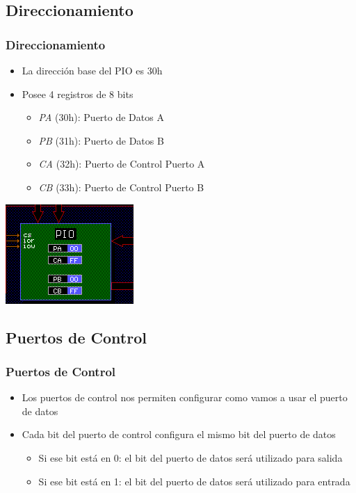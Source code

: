 \documentclass{beamer}
\begin{document}
\subsection{Direccionamiento}
\begin{frame}
\frametitle{Direccionamiento}
\begin{itemize}
 \item La dirección base del PIO es 30h
 \item Posee 4 registros de 8 bits
 \begin{itemize}
   \item \emph{PA} (30h): Puerto de Datos A
   \item \emph{PB} (31h): Puerto de Datos B
   \item \emph{CA} (32h): Puerto de Control Puerto A
   \item \emph{CB} (33h): Puerto de Control Puerto B
 \end{itemize}
 \end{itemize}
\begin{center}
 \includegraphics[scale=0.50]{pio.png}
\end{center}
\end{frame}

\subsection{Puertos de Control}
\begin{frame}
\frametitle{Puertos de Control}
\begin{itemize}
 \item Los puertos de control nos permiten configurar como vamos a usar el puerto de datos
 \item Cada bit del puerto de control configura el mismo bit del puerto de datos
 \begin{itemize}
   \item Si ese bit está en 0: el bit del puerto de datos será utilizado para salida
   \item Si ese bit está en 1: el bit del puerto de datos será utilizado para entrada
 \end{itemize}
\end{itemize}

\end{frame}
\end{document}
